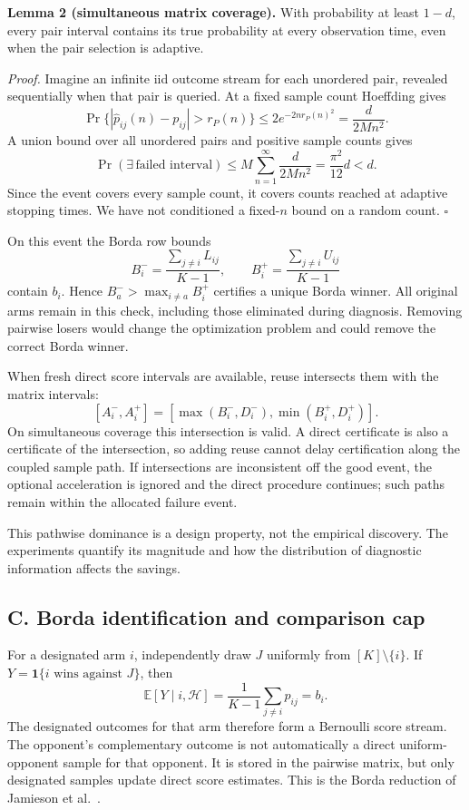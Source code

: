 \documentclass[11pt,a4paper]{article}
\newcommand{\E}{\mathbb E}
\begin{document}
\textbf{Lemma 2 (simultaneous matrix coverage).} With probability at least $1-d$, every pair interval contains its true probability at every observation time, even when the pair selection is adaptive.

\emph{Proof.} Imagine an infinite iid outcome stream for each unordered pair, revealed sequentially when that pair is queried. At a fixed sample count Hoeffding gives
\[
\Pr\{|\widehat p_{ij}(n)-p_{ij}|>r_P(n)\}
\le2e^{-2nr_P(n)^2}=\frac{d}{2Mn^2}.
\]
A union bound over all unordered pairs and positive sample counts gives
\[
\Pr(\exists\,\text{failed interval})
\le M\sum_{n=1}^\infty\frac{d}{2Mn^2}
=\frac{\pi^2}{12}d<d.
\]
Since the event covers every sample count, it covers counts reached at adaptive stopping times. We have not conditioned a fixed-$n$ bound on a random count. \hfill$\square$

On this event the Borda row bounds
\[
B_i^- =\frac{\sum_{j\ne i}L_{ij}}{K-1},\qquad
B_i^+ =\frac{\sum_{j\ne i}U_{ij}}{K-1}
\]
contain $b_i$. Hence $B_a^->\max_{i\ne a}B_i^+$ certifies a unique Borda winner. All original arms remain in this check, including those eliminated during diagnosis. Removing pairwise losers would change the optimization problem and could remove the correct Borda winner.

When fresh direct score intervals are available, reuse intersects them with the matrix intervals:
\[
[A_i^-,A_i^+]=[\max(B_i^-,D_i^-),\min(B_i^+,D_i^+)].
\]
On simultaneous coverage this intersection is valid. A direct certificate is also a certificate of the intersection, so adding reuse cannot delay certification along the coupled sample path. If intersections are inconsistent off the good event, the optional acceleration is ignored and the direct procedure continues; such paths remain within the allocated failure event.

This pathwise dominance is a design property, not the empirical discovery. The experiments quantify its magnitude and how the distribution of diagnostic information affects the savings.

\subsection{C. Borda identification and comparison cap}

For a designated arm $i$, independently draw $J$ uniformly from $[K]\setminus\{i\}$. If $Y=\mathbf1\{i\text{ wins against }J\}$, then
\[
\E[Y\mid i,\mathcal H]=\frac1{K-1}\sum_{j\ne i}p_{ij}=b_i.
\]
The designated outcomes for that arm therefore form a Bernoulli score stream. The opponent's complementary outcome is not automatically a direct uniform-opponent sample for that opponent. It is stored in the pairwise matrix, but only designated samples update direct score estimates. This is the Borda reduction of Jamieson et al.\ \cite{sparse}.
\end{document}
